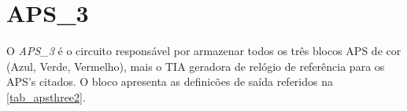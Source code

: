 \renewcommand{\NomeBloco}{\textit{APS\_3}}
\renewcommand{\NomeBlocoNoUnderline}{apsthree}
\renewcommand{\NomePTab}{tab_\NomeBlocoNoUnderline}
\renewcommand{\NomeSTab}{tab_\NomeBlocoNoUnderline2}
\renewcommand{\NomePFig}{fig_\NomeBlocoNoUnderline}
\renewcommand{\NomeSFig}{fig_\NomeBlocoNoUnderline2}
\renewcommand{\NomeTTab}{tab_\NomeBlocoNoUnderline3}
\renewcommand{\NomeQTab}{tab_\NomeBlocoNoUnderline4}

\section{APS\_3}

O \textit{\NomeBloco} \'e o circuito respons\'avel por armazenar todos os tr\^es blocos APS de cor (Azul, Verde, Vermelho), mais o TIA geradora de rel\'ogio de refer\^encia para os APS's citados. O bloco apresenta as definicões de sa\'ida referidos na \autoref{\NomeSTab}.

